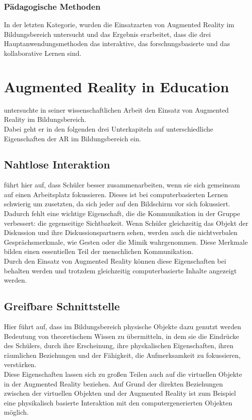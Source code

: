 \subsubsection{Pädagogische Methoden}
In der letzten Kategorie, wurden die Einsatzarten von Augmented Reality im Bildungsbereich untersucht und das Ergebnis erarbeitet, dass die drei Hauptanwendungsmethoden das interaktive, das forschungsbasierte und das kollaborative Lernen sind.

\section{Augmented Reality in Education}
\citeauthor{billinghurst:ar-in-education} untersuchte in seiner wissenschaftlichen Arbeit \citep{billinghurst:ar-in-education} den Einsatz von Augmented Reality im Bildungsbereich.\\
Dabei geht er in den folgenden drei Unterkapiteln auf unterschiedliche Eigenschaften der AR im Bildungsbereich ein.

\subsection{Nahtlose Interaktion}
\citeauthor{billinghurst:ar-in-education} führt hier auf, dass Schüler besser zusammenarbeiten, wenn sie sich gemeinsam auf einen Arbeitsplatz fokussieren. Dieses ist bei computerbasierten Lernen schwierig um zusetzten, da sich jeder auf den Bildschirm vor sich fokussiert. Dadurch fehlt eine wichtige Eigenschaft, die die Kommunikation in der Gruppe verbessert: die gegenseitige Sichtbarkeit. Wenn Schüler gleichzeitig das Objekt der Diskussion und ihre Diskussionspartnern sehen, werden auch die nichtverbalen Gesprächsmerkmale, wie Gesten oder die Mimik wahrgenommen. Diese Merkmale bilden einen essentiellen Teil der menschlichen Kommunikation. \\
Durch den Einsatz von Augmented Reality können diese Eigenschaften bei behalten werden und trotzdem gleichzeitig computerbasierte Inhalte angezeigt werden.

\subsection{Greifbare Schnittstelle}
Hier führt \citeauthor{billinghurst:ar-in-education} auf, dass im Bildungsbereich physische Objekte dazu genutzt werden Bedeutung von theoretischem Wissen zu übermitteln, in dem sie die Eindrücke des Schülers, durch ihre Erscheinung, ihre physkalischen Eigenschaften, ihren räumlichen Beziehungen und der Fähigkeit, die Aufmerksamkeit zu fokussieren, verstärken.\\
Diese Eigenschaften lassen sich zu großen Teilen auch auf die virtuellen Objekte in der Augmented Reality beziehen. Auf Grund der direkten Beziehungen zwischen der virtuellen Objekten und der Augmented Reality ist zum Beispiel eine physikalisch basierte Interaktion mit den computergenerierten Objekten möglich.

